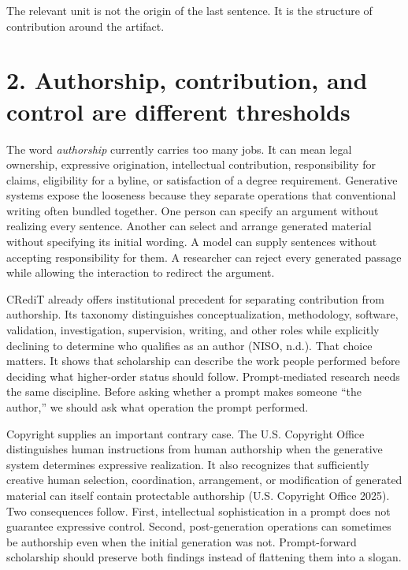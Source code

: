 \documentclass[
]{article}
\begin{document}
The relevant unit is not the origin of the last sentence. It is the
structure of contribution around the artifact.

\section{2. Authorship, contribution, and control are different
thresholds}\label{authorship-contribution-and-control-are-different-thresholds}

The word \emph{authorship} currently carries too many jobs. It can mean
legal ownership, expressive origination, intellectual contribution,
responsibility for claims, eligibility for a byline, or satisfaction of
a degree requirement. Generative systems expose the looseness because
they separate operations that conventional writing often bundled
together. One person can specify an argument without realizing every
sentence. Another can select and arrange generated material without
specifying its initial wording. A model can supply sentences without
accepting responsibility for them. A researcher can reject every
generated passage while allowing the interaction to redirect the
argument.

CRediT already offers institutional precedent for separating
contribution from authorship. Its taxonomy distinguishes
conceptualization, methodology, software, validation, investigation,
supervision, writing, and other roles while explicitly declining to
determine who qualifies as an author (NISO, n.d.). That choice matters.
It shows that scholarship can describe the work people performed before
deciding what higher-order status should follow. Prompt-mediated
research needs the same discipline. Before asking whether a prompt makes
someone ``the author,'' we should ask what operation the prompt
performed.

Copyright supplies an important contrary case. The U.S. Copyright Office
distinguishes human instructions from human authorship when the
generative system determines expressive realization. It also recognizes
that sufficiently creative human selection, coordination, arrangement,
or modification of generated material can itself contain protectable
authorship (U.S. Copyright Office 2025). Two consequences follow. First,
intellectual sophistication in a prompt does not guarantee expressive
control. Second, post-generation operations can sometimes be authorship
even when the initial generation was not. Prompt-forward scholarship
should preserve both findings instead of flattening them into a slogan.
\end{document}
